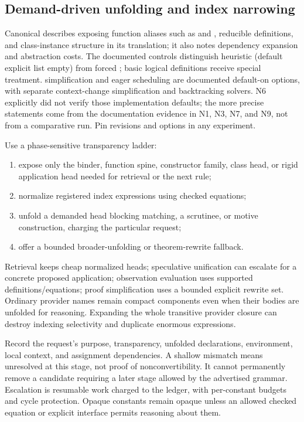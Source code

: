 \subsection{Demand-driven unfolding and index narrowing}\label{sec:dependent-unfolding}

Canonical describes exposing function aliases such as  and
, reducible definitions, and class-instance structure in its
translation; it also notes dependency expansion and abstraction costs.
The documented  controls distinguish heuristic 
(default explicit list empty) from forced ; basic logical
definitions receive special treatment.  simplification and
 eager scheduling are documented default-on options, with separate
context-change simplification and backtracking solvers. N6 explicitly did not
verify those implementation defaults; the more precise statements come from
the documentation evidence in N1, N3, N7, and N9, not from a comparative run.
Pin revisions and options in any experiment.\cite{canonical,sautodocs}

Use a phase-sensitive transparency ladder:
\begin{enumerate}
\item expose only the binder, function spine, constructor family, class head,
or rigid application head needed for retrieval or the next rule;
\item normalize registered index expressions using checked equations;
\item unfold a demanded head blocking matching, a scrutinee, or motive
construction, charging the particular request;
\item offer a bounded broader-unfolding or theorem-rewrite fallback.
\end{enumerate}
Retrieval keeps cheap normalized heads; speculative unification can escalate
for a concrete proposed application; observation evaluation uses supported
definitions/equations; proof simplification uses a bounded explicit rewrite
set. Ordinary provider names remain compact components even when their bodies
are unfolded for reasoning. Expanding the whole transitive provider closure
can destroy indexing selectivity and duplicate enormous expressions.

Record the request's purpose, transparency, unfolded declarations, environment,
local context, and assignment dependencies. A shallow mismatch means unresolved
at this stage, not proof of nonconvertibility. It cannot permanently remove a
candidate requiring a later stage allowed by the advertised grammar. Escalation
is resumable work charged to the ledger, with per-constant budgets and cycle
protection. Opaque constants remain opaque unless an allowed checked equation
or explicit interface permits reasoning about them.


